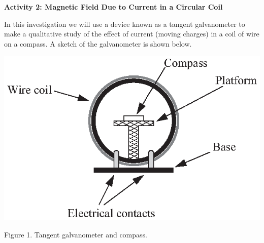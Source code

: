 \textbf{Activity 2: Magnetic Field Due to Current in a Circular Coil}

In this investigation we will use a device known as a tangent galvanometer to make a qualitative study of the effect of current (moving charges) in a coil of wire on a compass. A sketch of the galvanometer is shown below.

\begin{center}
\includegraphics{magnetism_currents/tangent_galvanometer_bw.eps}
\par
Figure 1. Tangent galvanometer and compass.
\end{center}

